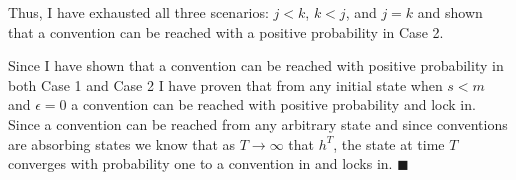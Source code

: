 \documentclass{article}
\begin{document}
\vskip12pt

Thus, I have exhausted all three scenarios: $j<k$, $k<j$, and $j=k$ and shown that a convention can be reached with a positive probability in Case 2.

\vskip18pt

Since I have shown that a convention can be reached with positive probability in both Case 1 and Case 2 I have proven that from any initial state when $s<m$ and $\epsilon=0$ a convention can be reached with positive probability and lock in. Since a convention can be reached from any arbitrary state and since conventions are absorbing states we know that as $T \rightarrow \infty$ that $h^T$, the state at time $T$ converges with probability one to a convention in and locks in. $\blacksquare$
\end{document}
